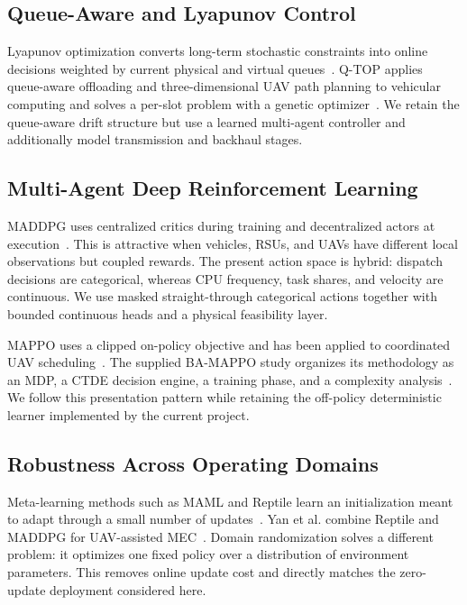 \documentclass[journal]{IEEEtran}
\begin{document}
\subsection{Queue-Aware and Lyapunov Control}
Lyapunov optimization converts long-term stochastic constraints into online
decisions weighted by current physical and virtual queues~\cite{neely2010stochastic,mao2017dynamic}.
Q-TOP applies queue-aware offloading and three-dimensional UAV path planning
to vehicular computing and solves a per-slot problem with a genetic
optimizer~\cite{sun2026qtop}. We retain the queue-aware drift structure but
use a learned multi-agent controller and additionally model transmission and
backhaul stages.

\subsection{Multi-Agent Deep Reinforcement Learning}
MADDPG uses centralized critics during training and decentralized actors at
execution~\cite{lowe2017multi}. This is attractive when vehicles, RSUs, and
UAVs have different local observations but coupled rewards. The present
action space is hybrid: dispatch decisions are categorical, whereas CPU
frequency, task shares, and velocity are continuous. We use masked
straight-through categorical actions together with bounded continuous heads
and a physical feasibility layer.

MAPPO uses a clipped on-policy objective and has been applied to coordinated
UAV scheduling~\cite{schulman2017proximal}. The supplied BA-MAPPO study
organizes its methodology as an MDP, a CTDE decision engine, a training
phase, and a complexity analysis~\cite{talukdar2026mappo}. We follow this
presentation pattern while retaining the off-policy deterministic learner
implemented by the current project.

\subsection{Robustness Across Operating Domains}
Meta-learning methods such as MAML and Reptile learn an initialization meant
to adapt through a small number of updates~\cite{finn2017model,nichol2018reptile}.
Yan et al. combine Reptile and MADDPG for UAV-assisted MEC~\cite{yan2026rmaddpg}.
Domain randomization solves a different problem: it optimizes one fixed policy
over a distribution of environment parameters. This removes online update
cost and directly matches the zero-update deployment considered here.
\end{document}

